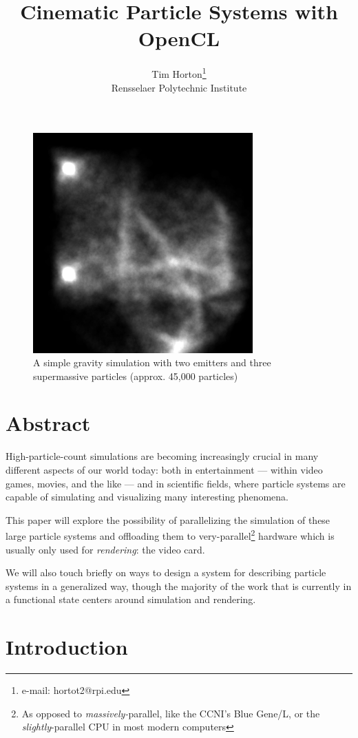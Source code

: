 \documentclass{acmsiggraph}
\title{Cinematic Particle Systems with OpenCL}
\author{Tim Horton\thanks{e-mail: hortot2@rpi.edu}\\Rensselaer Polytechnic Institute}
\begin{document}
\maketitle

\begin{figure}
    \includegraphics[width=84.5mm]{gravity.png}
    \caption{A simple gravity simulation with two emitters and three supermassive particles (approx. 45,000 particles)}
\end{figure}

\section*{Abstract}

High-particle-count simulations are becoming increasingly crucial in many different aspects of our world today: both in entertainment --- within video games, movies, and the like --- and in scientific fields, where particle systems are capable of simulating and visualizing many interesting phenomena.

This paper will explore the possibility of parallelizing the simulation of these large particle systems and offloading them to very-parallel\footnote{As opposed to {\it massively-}parallel, like the CCNI's Blue Gene/L, or the {\it slightly}-parallel CPU in most modern computers} hardware which is usually only used for {\it rendering}: the video card.

We will also touch briefly on ways to design a system for describing particle systems in a generalized way, though the majority of the work that is currently in a functional state centers around simulation and rendering.

\section{Introduction}
\end{document}
